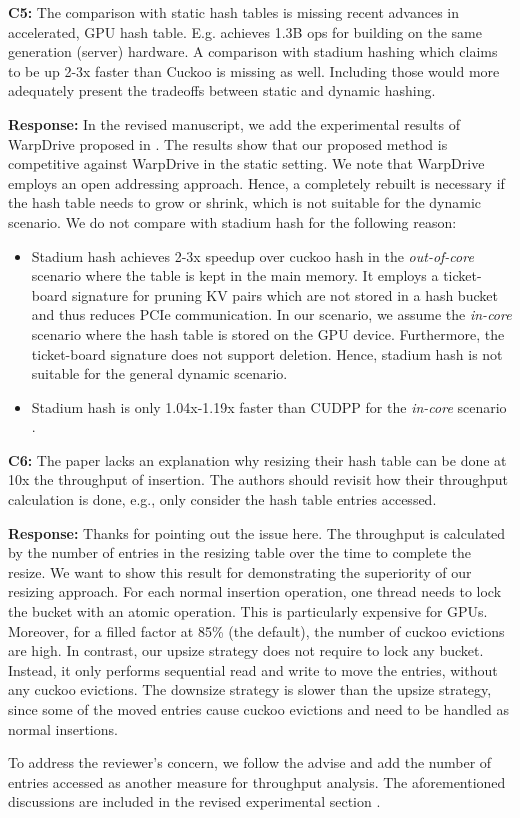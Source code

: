 \begin{shaded}
	\noindent\textbf{C5:} The comparison with static hash tables is missing recent advances in accelerated, GPU hash table. E.g. \cite{junger2018warpdrive} achieves 1.3B ops for building on the same generation (server) hardware. A comparison with stadium hashing \cite{khorasani2015stadium} which claims to be up 2-3x faster than Cuckoo is missing as well. Including those would more adequately present the tradeoffs between static and dynamic hashing.
\end{shaded}
%
\noindent\textbf{Response:} 
In the revised manuscript, we add the experimental results of WarpDrive proposed in \cite{junger2018warpdrive}. 
The results show that our proposed method is competitive against WarpDrive in the static setting. 
We note that WarpDrive employs an open addressing approach. Hence, a completely rebuilt is necessary if the hash table needs to grow or shrink, which is not suitable for the dynamic scenario. 
We do not compare with stadium hash \cite{khorasani2015stadium} for the following reason:
\begin{itemize}
	\item Stadium hash achieves 2-3x speedup over cuckoo hash in the \emph{out-of-core} scenario where the table is kept in the main memory. It employs a ticket-board signature for pruning KV pairs which are not stored in a hash bucket and thus reduces PCIe communication. In our scenario, we assume the \emph{in-core} scenario where the hash table is stored on the GPU device. Furthermore, the ticket-board signature does not support deletion. Hence, stadium hash is not suitable for the general dynamic scenario. 
	\item Stadium hash is only 1.04x-1.19x faster than CUDPP for the \emph{in-core} scenario \cite{khorasani2015stadium}. 
\end{itemize}



\begin{shaded}
	\noindent\textbf{C6:} The paper lacks an explanation why resizing their hash table can be done at 10x the throughput of insertion. The authors should revisit how their throughput calculation is done, e.g., only consider the hash table entries accessed.
\end{shaded}
%
\noindent\textbf{Response:}
Thanks for pointing out the issue here. The throughput is calculated by the number of entries in the resizing table over the time to complete the resize. 
We want to show this result for demonstrating the superiority of our resizing approach. 
For each normal insertion operation, one thread needs to lock the bucket with an atomic operation. This is particularly expensive for GPUs. Moreover, for a filled factor at 85\% (the default), the number of cuckoo evictions are high. In contrast, our upsize strategy does not require to lock any bucket. Instead, it only performs sequential read and write to move the entries, without any cuckoo evictions. The downsize strategy is slower than the upsize strategy, since some of the moved entries cause cuckoo evictions and need to be handled as normal insertions. 

To address the reviewer's concern, we follow the advise and add the number of entries accessed as another measure for throughput analysis. 
The aforementioned discussions are included in the revised experimental section .

